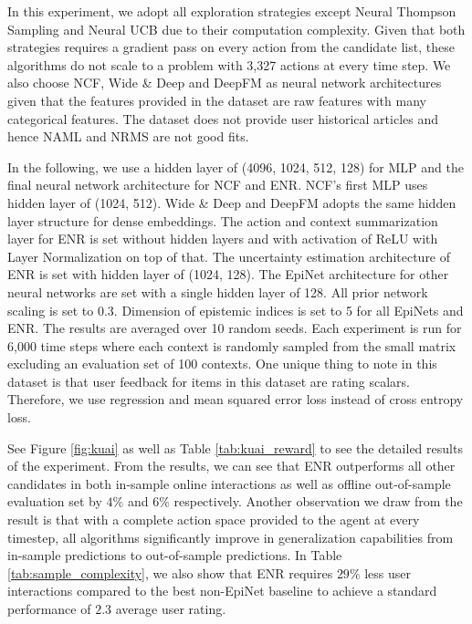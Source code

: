 In this experiment, we adopt all exploration strategies except Neural Thompson Sampling and Neural UCB due to their computation complexity. Given that both strategies requires a gradient pass on every action from the candidate list, these algorithms do not scale to a problem with 3,327 actions at every time step. We also choose NCF, Wide \& Deep and DeepFM as neural network architectures given that the features provided in the dataset are raw features with many categorical features. The dataset does not provide user historical articles and hence NAML and NRMS are not good fits.

In the following, we use a hidden layer of (4096, 1024, 512, 128) for MLP and the final neural network architecture for NCF and ENR. NCF's first MLP uses hidden layer of (1024, 512). Wide \& Deep and DeepFM adopts the same hidden layer structure for dense embeddings. The action and context summarization layer for ENR is set without hidden layers and with activation of ReLU with Layer Normalization on top of that. The uncertainty estimation architecture of ENR is set with hidden layer of (1024, 128). The EpiNet architecture for other neural networks are set with a single hidden layer of 128. All prior network scaling is set to 0.3. Dimension of epistemic indices is set to 5 for all EpiNets and ENR. The results are averaged over 10 random seeds. Each experiment is run for 6,000 time steps where each context is randomly sampled from the small matrix excluding an evaluation set of 100 contexts. One unique thing to note in this dataset is that user feedback for items in this dataset are rating scalars. Therefore, we use regression and mean squared error loss instead of cross entropy loss.

See Figure \ref{fig:kuai} as well as Table \ref{tab:kuai_reward} to see the detailed results of the experiment. From the results, we can see that ENR outperforms all other candidates in both in-sample online interactions as well as offline out-of-sample evaluation set by $4\%$ and $6\%$ respectively. Another observation we draw from the result is that with a complete action space provided to the agent at every timestep, all algorithms significantly improve in generalization capabilities from in-sample predictions to out-of-sample predictions. In Table \ref{tab:sample_complexity}, we also show that ENR requires $29\%$ less user interactions compared to the best non-EpiNet baseline to achieve a standard performance of $2.3$ average user rating. 

\vspace{-0.1in}
